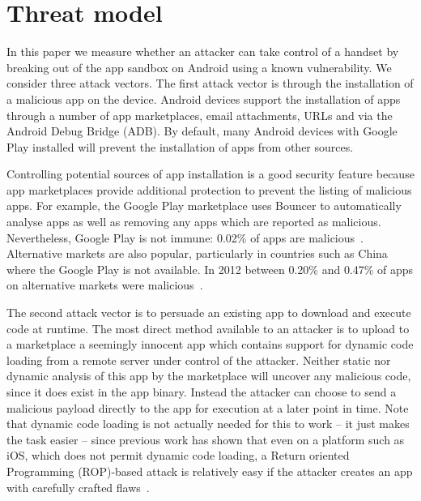 \documentclass{llncs}
\begin{document}
\section{Threat model}
\label{sec:threatmodel}

In this paper we measure whether an attacker can take control of a handset by breaking out of the app sandbox on Android using a known vulnerability.
We consider three attack vectors.
The first attack vector is through the installation of a malicious app on the device.
Android devices support the installation of apps through a number of app marketplaces, email attachments, URLs and via the Android Debug Bridge (ADB).
By default, many Android devices with Google Play installed will prevent the installation of apps from other sources.

Controlling potential sources of app installation is a good security feature because app marketplaces provide additional protection to prevent the listing of malicious apps.
For example, the Google Play marketplace uses Bouncer to automatically analyse apps as well as removing any apps which are reported as malicious.
Nevertheless, Google Play is not immune: 0.02\% of apps are malicious~\cite{Zhou2012a}.
Alternative markets are also popular, particularly in countries such as China where the Google Play is not available. 
In 2012 between 0.20\% and 0.47\% of apps on alternative markets were malicious~\cite{Zhou2012a}.

The second attack vector is to persuade an existing app to download and execute code at runtime.
The most direct method available to an attacker is to upload to a marketplace a seemingly innocent app which contains support for dynamic code loading from a remote server under control of the attacker.
Neither static nor dynamic analysis of this app by the marketplace will uncover any malicious code, since it does exist in the app binary.
Instead the attacker can choose to send a malicious payload directly to the app for execution at a later point in time.
Note that dynamic code loading is not actually needed for this to work -- it just makes the task easier -- since previous work has shown that even on a platform such as iOS, which does not permit dynamic code loading, a Return oriented Programming (ROP)-based attack is relatively easy if the attacker creates an app with carefully crafted flaws~\cite{Wang2013a}.
\end{document}
